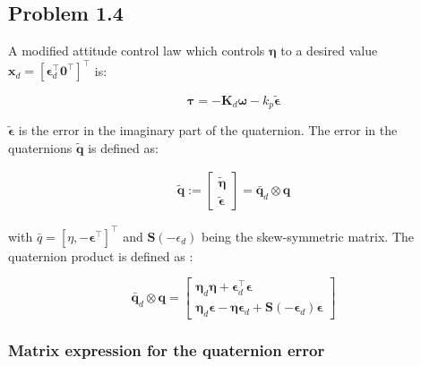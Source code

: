 
\subsection*{Problem 1.4}
A modified attitude control law which controls $\boldsymbol{\eta}$ to a desired value $\mathbf{x}_d = [\boldsymbol{\epsilon}_d^\top \boldsymbol{0}^\top]^\top$ is:

\begin{equation}
    \boldsymbol{\tau} = - \mathbf{K}_d \boldsymbol{\omega} - k_p \tilde{\boldsymbol{\epsilon}}
    \label{eq:control_law_attitude2}
\end{equation}

$\tilde{\boldsymbol{\epsilon}}$ is the error in the imaginary part of the quaternion. The error in the quaternions $\tilde{\mathbf{q}}$ is defined as:

\begin{equation}
    \begin{aligned}
    \tilde{\boldsymbol{q}}
    :=
    \begin{bmatrix}
    \tilde{\boldsymbol{\eta}} \\
    \tilde{\boldsymbol{\epsilon}}
    \end{bmatrix}
    =
    \bar{\boldsymbol{q}}_d \otimes \boldsymbol{q}
    \label{eq:q_tilde}
    \end{aligned}
\end{equation}

with $\bar{q} = [\eta, -\boldsymbol{\epsilon}^\top] ^\top$ and $\mathbf{S}(-\epsilon_d)$ being the skew-symmetric matrix. The quaternion product is defined as :

\begin{equation}
    \bar{\boldsymbol{q}}_d \otimes \boldsymbol{q}
    =
    \begin{bmatrix}
    \boldsymbol{\eta}_{d} \boldsymbol{\eta} + \boldsymbol{\epsilon}_d^\top \boldsymbol{\epsilon} \\
    \boldsymbol{\eta}_d \boldsymbol{\epsilon} - \boldsymbol{\eta} \boldsymbol{\epsilon}_d + \mathbf{S}(-\boldsymbol{\epsilon}_d) \boldsymbol{\epsilon}
    \end{bmatrix}
    \label{eq:q_product}
\end{equation}

\subsubsection*{ Matrix expression for the quaternion error}

